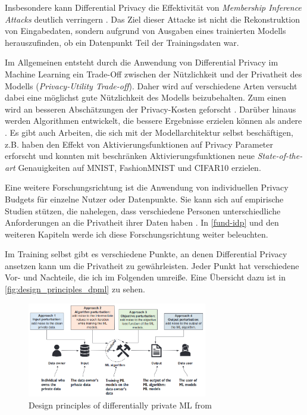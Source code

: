 Insbesondere kann Differential Privacy die Effektivität von \textit{Membership Inference Attacks}\cite{shokri:2017} deutlich verringern \cite[p.14f]{chang:2023}. Das Ziel dieser Attacke ist nicht die Rekonstruktion von Eingabedaten, sondern aufgrund von Ausgaben eines trainierten Modells herauszufinden, ob ein Datenpunkt Teil der Trainingsdaten war.

Im Allgemeinen entsteht durch die Anwendung von Differential Privacy im Machine Learning ein Trade-Off zwischen der Nützlichkeit und der Privatheit des Modells (\textit{Privacy-Utility Trade-off}). Daher wird auf verschiedene Arten versucht dabei eine möglichst gute Nützlichkeit des Modells beizubehalten. Zum einen wird an besseren Abschätzungen der Privacy-Kosten geforscht \cite{dwork:2010, abadi:2016, mironov:2019}. Darüber hinaus werden Algorithmen entwickelt, die bessere Ergebnisse erzielen können als andere \cite{papernot:2017}. Es gibt auch Arbeiten, die sich mit der Modellarchitektur selbst beschäftigen, z.B. haben \textcite{papernot:2021} den Effekt von Aktivierungsfunktionen auf Privacy Parameter erforscht und konnten mit beschränken Aktivierungsfunktionen neue \textit{State-of-the-art} Genauigkeiten auf MNIST, FashionMNIST und CIFAR10 erzielen.

Eine weitere Forschungsrichtung ist die Anwendung von individuellen Privacy Budgets für einzelne Nutzer oder Datenpunkte. Sie kann sich auf empirische Studien stützen, die nahelegen, dass verschiedene Personen unterschiedliche Anforderungen an die Privatheit ihrer Daten haben \cite{jensen:2005, acquisti:2005}. In \autoref{fund-idp} und den weiteren Kapiteln werde ich diese Forschungsrichtung weiter beleuchten.

Im Training selbst gibt es verschiedene Punkte, an denen Differential Privacy ansetzen kann um die Privatheit zu gewährleisten. Jeder Punkt hat verschiedene Vor- und Nachteile, die ich im Folgenden umreiße. Eine Übersicht dazu ist in \autoref{fig:design_principles_dpml} zu sehen.

\begin{figure}[tb]
	\centering
	\includegraphics[width=0.7\textwidth]{Bilder/design_principles_dpml.png}
	\caption{Design principles of differentially private ML from \textcite{chang:2023}}
	\label{fig:design_principles_dpml}
\end{figure}

